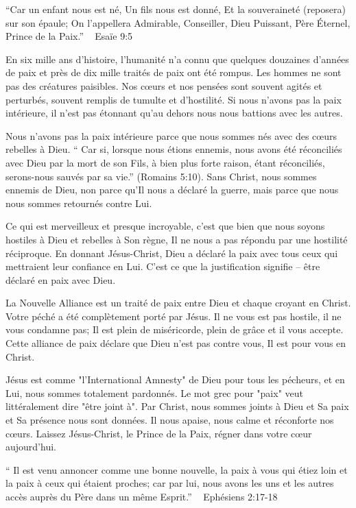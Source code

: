 

“Car un enfant nous est né, Un fils nous est donné, Et la souveraineté (reposera) sur son épaule; On l’appellera Admirable, Conseiller, Dieu Puissant, Père Éternel, Prince de la Paix.” ~ Esaïe 9:5

En six mille ans d'histoire, l'humanité n'a connu que quelques douzaines d'années de paix et près de dix mille traités de paix ont été rompus. Les hommes ne sont pas des créatures paisibles. Nos cœurs et nos pensées sont souvent agités et perturbés, souvent remplis de tumulte et d'hostilité. Si nous n'avons pas la paix intérieure, il n'est pas étonnant qu'au dehors nous nous battions avec les autres.

Nous n'avons pas la paix intérieure parce que nous sommes nés avec des cœurs rebelles à Dieu. “ Car si, lorsque nous étions ennemis, nous avons été réconciliés avec Dieu par la mort de son Fils, à bien plus forte raison, étant réconciliés, serons-nous sauvés par sa vie.” (Romains 5:10). Sans Christ, nous sommes ennemis de Dieu, non parce qu'Il nous a déclaré la guerre, mais parce que nous nous sommes retournés contre Lui.

Ce qui est merveilleux et presque incroyable, c'est que bien que nous soyons hostiles à Dieu et rebelles à Son règne, Il ne nous a pas répondu par une hostilité réciproque. En donnant Jésus-Christ, Dieu a déclaré la paix avec tous ceux qui mettraient leur confiance en Lui. C'est ce que la justification signifie – être déclaré en paix avec Dieu.

La Nouvelle Alliance est un traité de paix entre Dieu et chaque croyant en Christ. Votre péché a été complètement porté par Jésus. Il ne vous est pas hostile, il ne vous condamne pas; Il est plein de miséricorde, plein de grâce et il vous accepte. Cette alliance de paix déclare que Dieu n'est pas contre vous, Il est pour vous en Christ.

Jésus est comme "l'International Amnesty" de Dieu pour tous les pécheurs, et en Lui, nous sommes totalement pardonnés. Le mot grec pour "paix" veut littéralement dire "être joint à". Par Christ, nous sommes joints à Dieu et Sa paix et Sa présence nous sont données. Il nous apaise, nous calme et réconforte nos cœurs. Laissez Jésus-Christ, le Prince de la Paix, régner dans votre cœur aujourd'hui.


“ Il est venu annoncer comme une bonne nouvelle, la paix à vous qui étiez loin et la paix à ceux qui étaient proches; car par lui, nous avons les uns et les autres accès auprès du Père dans un même Esprit.”            ~ Ephésiens 2:17-18

